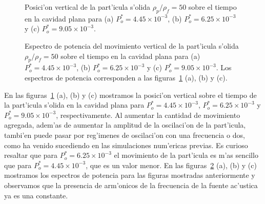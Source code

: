 \begin{figure} 



%
%
\caption{\label{fig:paths-rho-30-flat}
Posici'on vertical de la part'icula s'olida $\rho_p/\rho_f=50$ sobre el tiempo en la cavidad plana para
(a) $P_o^\ast = 4.45\times 10^{-3} $, (b) $P_o^\ast = 6.25\times 10^{-3}$ y (c) $P_o^\ast = 9.05\times 10^{-3}$.
}
\end{figure}
\begin{figure} 



%
%
\caption{\label{fig:paths-rho-30-flat-spectrum}
Espectro de potencia del movimiento vertical de la part'icula s'olida $\rho_p/\rho_f=50$ sobre el tiempo en la cavidad plana para
(a) $P_o^\ast = 4.45\times 10^{-3} $, (b) $P_o^\ast = 6.25\times 10^{-3}$ y (c) $P_o^\ast = 9.05\times 10^{-3}$. 
Los espectros de potencia corresponden  a las 
figuras~\ref{fig:paths-rho-30-flat} (a), (b) y (c).
}
\end{figure}

En las figuras~\ref{fig:paths-rho-30-flat} (a), (b) y (c) mostramos la posici'on vertical sobre el tiempo de la part'icula
s'olida en la cavidad plana para $P_o^\ast = 4.45\times 10^{-3} $, $P_o^\ast = 6.25\times 10^{-3}$ y $P_o^\ast = 9.05\times 10^{-3}$,
respectivamente. Al aumentar la cantidad de movimiento agregada, adem'as de aumentar la amplitud de la oscilaci'on
de la part'icula, tambi'en puede pasar por reg'imenes de oscilaci'on con una frecuencia o dos, como ha venido sucediendo
en las simulaciones num'ericas previas. Es curioso resaltar que para  $P_o^\ast = 6.25\times 10^{-3}$ el movimiento de 
la part'icula es m'as sencillo que para  $P_o^\ast = 4.45\times 10^{-3} $, que es un valor menor.
En las figuras~\ref{fig:paths-rho-30-flat-spectrum} (a), (b) y (c) mostramos los espectros
de potencia para las figuras mostradas anteriormente y observamos que  la presencia de arm'onicos de la frecuencia
de la fuente ac'ustica  ya es una constante.



